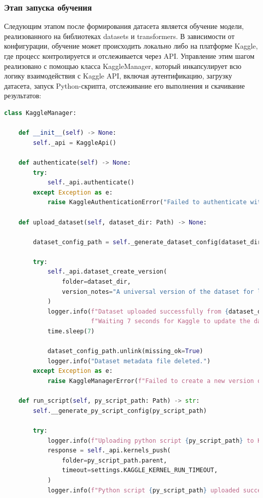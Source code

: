 \subsubsection{Этап запуска обучения}
Следующим этапом после формирования датасета является обучение модели, реализованного на библиотеках datasets и transformers. В зависимости от конфигурации, обучение может происходить локально либо на платформе Kaggle, где процесс контролируется и отслеживается через API. Управление этим шагом реализовано с помощью класса KaggleManager, который инкапсулирует всю логику взаимодействия с Kaggle API, включая аутентификацию, загрузку датасета, запуск Python-скрипта, отслеживание его выполнения и скачивание результатов:
\begin{lstlisting}[language=Python, numbers=none, frame=none]
class KaggleManager:

    def __init__(self) -> None:
        self._api = KaggleApi()

    def authenticate(self) -> None:
        try:
            self._api.authenticate()
        except Exception as e:
            raise KaggleAuthenticationError("Failed to authenticate with Kaggle API") from e

    def upload_dataset(self, dataset_dir: Path) -> None:
    
        dataset_config_path = self._generate_dataset_config(dataset_dir)

        try:
            self._api.dataset_create_version(
                folder=dataset_dir,
                version_notes="A universal version of the dataset for launching training",
            )
            logger.info(f"Dataset uploaded successfully from {dataset_dir}."
                        f"Waiting 7 seconds for Kaggle to update the data.")
            time.sleep(7)

            dataset_config_path.unlink(missing_ok=True)
            logger.info("Dataset metadata file deleted.")
        except Exception as e:
            raise KaggleManagerError(f"Failed to create a new version of the dataset from {dataset_dir}.") from e

    def run_script(self, py_script_path: Path) -> str:
        self.__generate_py_script_config(py_script_path)

        try:
            logger.info(f"Uploading python script {py_script_path} to Kaggle...")
            response = self._api.kernels_push(
                folder=py_script_path.parent,
                timeout=settings.KAGGLE_KERNEL_RUN_TIMEOUT,
            )
            logger.info(f"Python script {py_script_path} uploaded successfully.")


\end{lstlisting}
